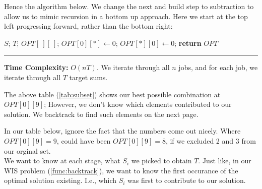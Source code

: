     \noindent
    Hence the algorithm below. We change the next and build step to subtraction to allow us to mimic recursion in a 
    bottom up approach. Here we start at the top left progressing forward, rather than the bottom right:
    \begin{Func}
        \label{func:subset}
        \vspace{-.5em}
        \begin{algorithm}[H]
            \SetAlgoLined
            $S$; $T$; $OPT[\ ][\ ]$; 
            $OPT[0][*] \gets 0$; 
            $OPT[*][0] \gets 0$; 
            \textbf{return} $OPT$\;
        \end{algorithm}
        \noindent
        \rule{\textwidth}{0.4pt}
        \textbf{Time Complexity:} $O(nT)$. We iterate through all $n$ jobs, and for each job, we iterate through all $T$ target sums.
    \end{Func}

    \noindent
    The above table (\ref{tab:subset}) shows our best possible combination at $OPT[0][9]$; However, we don't know which elements
    contributed to our solution. We backtrack to find such elements on the next page.

    \newpage 

    \noindent
    In our table below, ignore the fact that the numbers come out nicely. Where $OPT[0][9]=9$, could have been $OPT[0][9]=8$, if we excluded 2 and 3 from our orginal set.\\

    \noindent
    We want to know at each stage, what $S_i$ we picked to obtain $T$. Just like, in our WIS problem (\ref{func:backtrack}), we want to know 
    the first occurance of the optimal solution existing. I.e., which $S_i$ was first to contribute to our solution.\\
    
